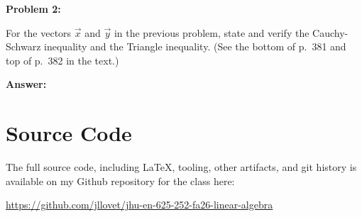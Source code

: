 \documentclass[10pt,letterpaper,final]{report}
\begin{document}
\pagebreak

\noindent\textbf{Problem 2:}
\medskip

For the vectors $\vec{x}$ and $\vec{y}$ in the previous problem, state and verify the Cauchy-Schwarz inequality and the Triangle inequality. (See the bottom of p.~381 and top of p.~382 in the text.)

\medskip
\noindent\textbf{Answer:}

\pagebreak

\section*{Source Code}
The full source code, including LaTeX, tooling, other artifacts, and git history is available on my Github repository for the class here:
\begin{center}
  \url{https://github.com/jllovet/jhu-en-625-252-fa26-linear-algebra}
\end{center}

\printbibliography
\end{document}
